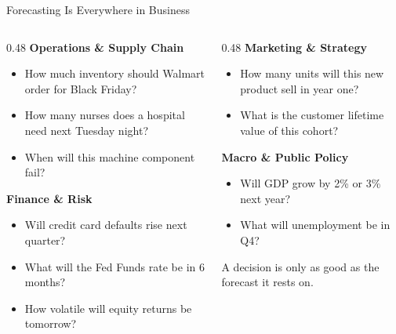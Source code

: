 \documentclass[aspectratio=169, 11pt]{beamer}
\begin{document}
\begin{frame}{Forecasting Is Everywhere in Business}
  \begin{columns}[T]
    \begin{column}{0.48\textwidth}
      \textbf{Operations \& Supply Chain}
      \begin{itemize}
        \item How much inventory should Walmart order for Black Friday?
        \item How many nurses does a hospital need next Tuesday night?
        \item When will this machine component fail?
      \end{itemize}
      \vspace{0.2cm}
      \textbf{Finance \& Risk}
      \begin{itemize}
        \item Will credit card defaults rise next quarter?
        \item What will the Fed Funds rate be in 6 months?
        \item How volatile will equity returns be tomorrow?
      \end{itemize}
    \end{column}
    \begin{column}{0.48\textwidth}
      \textbf{Marketing \& Strategy}
      \begin{itemize}
        \item How many units will this new product sell in year one?
        \item What is the customer lifetime value of this cohort?
      \end{itemize}
      \vspace{0.4cm}
      \textbf{Macro \& Public Policy}
      \begin{itemize}
        \item Will GDP grow by 2\% or 3\% next year?
        \item What will unemployment be in Q4?
      \end{itemize}
      \vspace{0.2cm}
      \begin{keybox}
        A decision is only as good as the forecast it rests on.
      \end{keybox}
    \end{column}
  \end{columns}
\end{frame}
\end{document}
